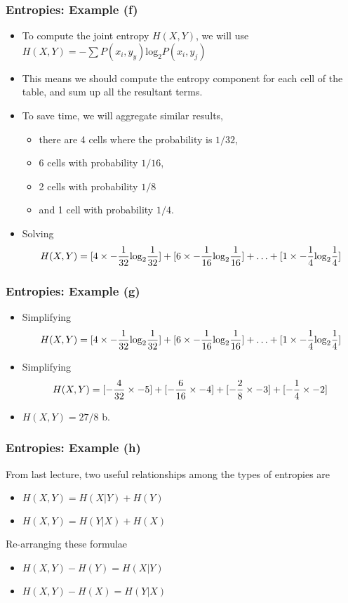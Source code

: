 ﻿\documentclass[a4]{beamer}
\begin{document}
\begin{frame}
\frametitle{Entropies: Example (f)}
\begin{itemize}

\item To compute the joint entropy $H(X,Y)$,  we will use $H(X,Y) = -\sum P(x_i,y_y) \mbox{log}_2P(x_i,y_j)$
\bigskip
\item This means we should compute the entropy component for each cell of the table, and sum up all the resultant terms.
\bigskip
\item To save time, we will aggregate similar results, \begin{itemize} \item there are 4 cells where the probability is $1/32$,\item 6 cells with probability $1/16$, \item 2 cells with probability $1/8$ \item and 1 cell with probability $1/4$. \end{itemize}
\item Solving
\[ H(X,Y) = [4 \times -{1\over 32} \mbox{log}_2 {1\over 32} ] + [6 \times -{1\over 16} \mbox{log}_2 {1\over 16} ] + \ldots + [1 \times -{1\over 4} \mbox{log}_2 {1\over 4} ] \]
\end{itemize}
\end{frame}

\begin{frame}
\frametitle{Entropies: Example (g)}
\begin{itemize}
\item Simplifying\[ H(X,Y) = [4 \times -{1\over 32} \mbox{log}_2 {1\over 32} ] + [6 \times -{1\over 16} \mbox{log}_2 {1\over 16} ] + \ldots + [1 \times -{1\over 4} \mbox{log}_2 {1\over 4} ] \]
\item Simplifying \[H(X,Y) = [-{4\over 32} \times -5 ] + [-{6\over 16} \times -4 ] + [-{2\over 8} \times -3 ] + [ -{1\over 4} \times -2]\]
\item $H(X,Y) = 27/8$ b.
\end{itemize}
\end{frame}

\begin{frame}
\frametitle{Entropies: Example (h)}
From last lecture, two useful relationships among the types of entropies are
\begin{itemize}
\item $H(X,Y)=H(X|Y)+H(Y) $
\item $H(X,Y)=H(Y|X)+H(X) $
\end{itemize}
\bigskip
Re-arranging these formulae
\begin{itemize}
\item $H(X,Y)-H(Y) = H(X|Y) $
\item $H(X,Y)-H(X) = H(Y|X) $
\end{itemize}
\end{frame}
\end{document}
